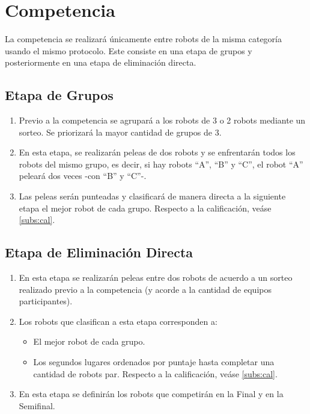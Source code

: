\documentclass[11pt]{article}
\begin{document}
\section{Competencia}

La competencia se realizará únicamente entre robots de la misma categoría usando el mismo protocolo. Este consiste en una etapa de grupos y posteriormente en una etapa de eliminación directa. \\

\subsection{Etapa de Grupos}
\begin{enumerate}
    \item Previo a la competencia se agrupará a los robots de 3 o 2 robots mediante un sorteo. Se priorizará la mayor cantidad de grupos de 3.
    \item En esta etapa, se realizarán peleas de dos robots y se enfrentarán todos los robots del mismo grupo, es decir, si hay robots ``A'', ``B'' y ``C'', el robot ``A'' peleará dos veces -con ``B'' y ``C''-.
    \item Las peleas serán punteadas y clasificará de manera directa a la siguiente etapa el mejor robot de cada grupo. Respecto a la calificación, veáse \ref{subs:cal}.
\end{enumerate}

\subsection{Etapa de Eliminación Directa}
\begin{enumerate}
    \item  En esta etapa se realizarán peleas entre dos robots de acuerdo a un sorteo realizado previo a la competencia (y acorde a la cantidad de equipos participantes).
    \item Los robots que clasifican a esta etapa corresponden a:
    \begin{itemize}
        \item El mejor robot de cada grupo.
        \item Los segundos lugares ordenados por puntaje hasta completar una cantidad de robots par. Respecto a la calificación, veáse \ref{subs:cal}.
    \end{itemize}
    \item En esta etapa se definirán los robots que competirán en la Final y en la Semifinal.
\end{enumerate}
\end{document}
